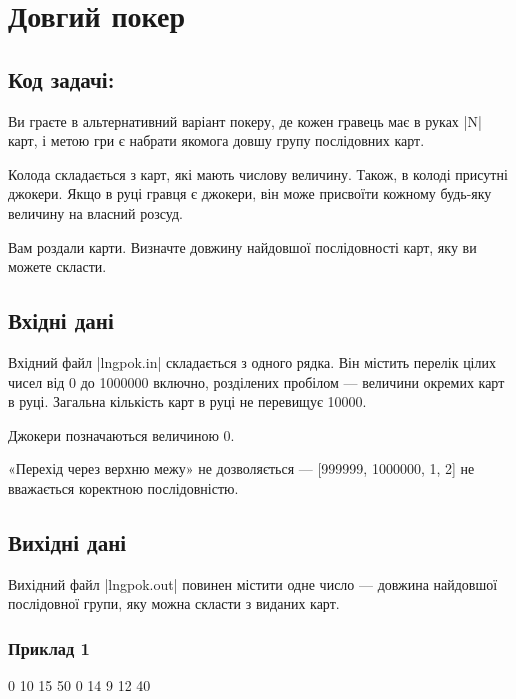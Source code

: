 \documentclass[12pt,a4paper]{article}
\begin{document}
\section*{Довгий покер \hfill {}}


\subsection*{Код задачі: }

Ви граєте в альтернативний варіант покеру, де кожен гравець має в руках |N| карт, і метою гри є набрати якомога довшу групу послідовних карт.

Колода складається з карт, які мають числову величину.
Також, в колоді присутні джокери.
Якщо в руці гравця є джокери, він може присвоїти кожному будь-яку величину на власний розсуд.

Вам роздали карти.
Визначте довжину найдовшої послідовності карт, яку ви можете скласти.

\subsection*{Вхідні дані}

Вхідний файл |lngpok.in| складається з одного рядка.
Він містить перелік цілих чисел від 0 до 1000000 включно, розділених пробілом --- величини окремих карт в руці.
Загальна кількість карт в руці не перевищує 10000.

Джокери позначаються величиною 0.

«Перехід через верхню межу» не дозволяється --- [999999, 1000000, 1, 2] не вважається коректною послідовністю.


\subsection*{Вихідні дані}

Вихідний файл |lngpok.out| повинен містити одне число --- довжина найдовшої послідовної групи, яку можна скласти з виданих карт.


\pagebreak


\subsubsection*{Приклад 1}

\textbf{}

\begin{codeblock}
0 10 15 50 0 14 9 12 40
\end{codeblock}
\end{document}
